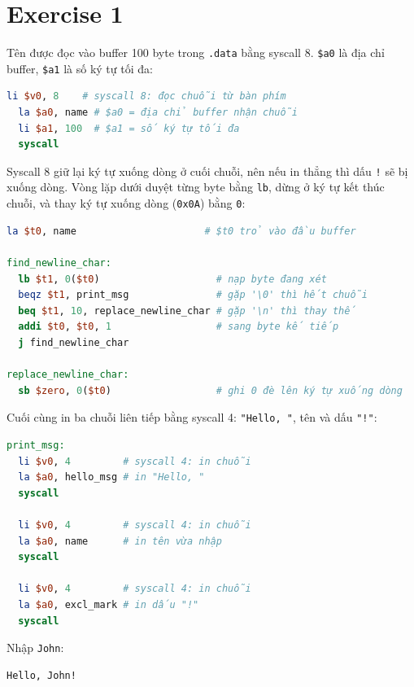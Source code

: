 \section{Exercise 1}

Tên được đọc vào buffer 100 byte trong \texttt{.data} bằng syscall 8. \texttt{\$a0} là địa chỉ buffer, \texttt{\$a1} là số ký tự tối đa:

\begin{lstlisting}[language=MIPS,numbers=none]
  li $v0, 8    # syscall 8: đọc chuỗi từ bàn phím
  la $a0, name # $a0 = địa chỉ buffer nhận chuỗi
  li $a1, 100  # $a1 = số ký tự tối đa
  syscall
\end{lstlisting}

Syscall 8 giữ lại ký tự xuống dòng ở cuối chuỗi, nên nếu in thẳng thì dấu \texttt{!} sẽ bị xuống dòng. Vòng lặp dưới duyệt từng byte bằng \texttt{lb}, dừng ở ký tự kết thúc chuỗi, và thay ký tự xuống dòng (\texttt{0x0A}) bằng \texttt{0}:

\begin{lstlisting}[language=MIPS,numbers=none]
  la $t0, name                      # $t0 trỏ vào đầu buffer

find_newline_char:
  lb $t1, 0($t0)                    # nạp byte đang xét
  beqz $t1, print_msg               # gặp '\0' thì hết chuỗi
  beq $t1, 10, replace_newline_char # gặp '\n' thì thay thế
  addi $t0, $t0, 1                  # sang byte kế tiếp
  j find_newline_char

replace_newline_char:
  sb $zero, 0($t0)                  # ghi 0 đè lên ký tự xuống dòng
\end{lstlisting}

Cuối cùng in ba chuỗi liên tiếp bằng syscall 4: \texttt{"Hello, "}, tên và dấu \texttt{"!"}:

\begin{lstlisting}[language=MIPS,numbers=none]
print_msg:
  li $v0, 4         # syscall 4: in chuỗi
  la $a0, hello_msg # in "Hello, "
  syscall

  li $v0, 4         # syscall 4: in chuỗi
  la $a0, name      # in tên vừa nhập
  syscall

  li $v0, 4         # syscall 4: in chuỗi
  la $a0, excl_mark # in dấu "!"
  syscall
\end{lstlisting}

Nhập \texttt{John}:

\begin{lstlisting}[language={},numbers=none]
Hello, John!
\end{lstlisting}
